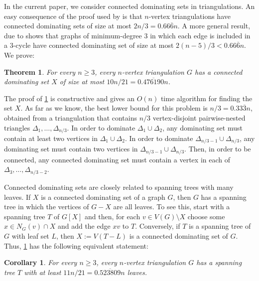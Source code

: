\documentclass{article}
\newtheorem{thm}{Theorem}
\newtheorem{cor}{Corollary}
\theoremstyle{definition}
\begin{document}
In the current paper, we consider connected dominating sets in triangulations.  An easy consequence of the proof used by \citet{matheson.tarjan:dominating} is that $n$-vertex triangulations have connected dominating sets of size at most $2n/3=0.66\overline{6}n$.  A more general result, due to  \citet{kleitman.west:spanning} shows that graphs of minimum-degree $3$ in which each edge is included in a $3$-cycle have connected dominating set of size at most $2(n-5)/3<0.66\overline{6}n$. We prove:

\begin{thm}\label{main_result2}
  For every $n\ge 3$, every $n$-vertex triangulation $G$ has a connected dominating set $X$ of size at most $10n/21= 0.\overline{476190}n$.
\end{thm}

The proof of \cref{main_result2} is constructive and gives an $O(n)$ time algorithm for finding the set $X$.  As far as we know, the best lower bound for this problem is $n/3 = 0.33\overline{3} n$, obtained from a triangulation that contains $n/3$ vertex-disjoint pairwise-nested triangles $\Delta_1,\ldots,\Delta_{n/3}$.  In order to dominate $\Delta_1\cup \Delta_2$, any dominating set must contain at least two vertices in $\Delta_1 \cup \Delta_2$. In order to dominate $\Delta_{n/3-1}\cup \Delta_{n/3}$, any dominating set must contain two vertices in $\Delta_{n/3-1}\cup\Delta_{n/3}$.  Then, in order to be connected, any connected dominating set must contain a vertex in each of $\Delta_3,\ldots,\Delta_{n/3-2}$.

Connected dominating sets are closely related to spanning trees with many leaves.  If $X$ is a connected dominating set of a graph $G$, then $G$ has a spanning tree in which the vertices of $G-X$ are all leaves.  To see this, start with a spanning tree $T$ of $G[X]$ and then, for each  $v\in V(G)\setminus X$ choose some $x\in N_G(v)\cap X$ and add the edge $xv$ to $T$. Conversely, if $T$ is a spanning tree of $G$ with leaf set $L$, then $X:=V(T-L)$ is a connected dominating set of $G$.  Thus, \cref{main_result2} has the following equivalent statement:

\begin{cor}\label{main_theorem_cor}
  For every $n\ge 3$, every $n$-vertex triangulation $G$ has a spanning tree $T$ with at least $11n/21= 0.\overline{523809}n$ leaves.
\end{cor}
\end{document}
